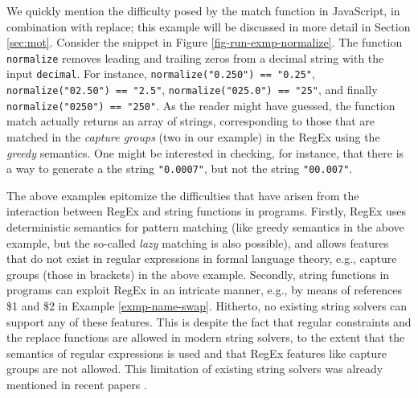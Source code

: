 \begin{example}\label{ex:normalize}
    We quickly mention the difficulty posed by the match function in JavaScript,
    in combination with replace; this example will be discussed in more
    detail in Section \ref{sec:mot}. Consider the snippet in Figure 
    \ref{fig-run-exmp-normalize}.
 The function {\tt normalize}   removes leading and trailing zeros from a decimal string with the input %
{\tt decimal}. For instance, 
 \texttt{normalize("0.250") == "0.25"},
 \texttt{normalize("02.50") == "2.5"},
 \texttt{normalize("025.0") == "25"},
and finally  \texttt{normalize("0250") == "250"}. As the reader might have
    guessed, the function match actually returns an array of strings,
    corresponding to those that are matched in the \emph{capture groups} (two 
    in our example) in the RegEx using the \emph{greedy} semantics. One might be
    interested in checking, for instance, that there is a way to generate a
    the string \texttt{"0.0007"}, but not the string \texttt{"00.007"}.
\end{example}



The above examples epitomize the difficulties that have arisen from the
interaction between RegEx and string functions in programs. Firstly,
RegEx uses deterministic semantics for pattern matching (like greedy
semantics in the above example, but the so-called \emph{lazy} matching is
also possible), and allows features that do not exist in regular expressions in
formal language theory, e.g., capture groups (those in brackets) in the above
example. Secondly, string functions in programs can exploit RegEx in an
intricate manner, e.g., by means of references \$1 and \$2 in Example 
\ref{exmp-name-swap}. Hitherto, no existing string solvers
can support any of these features. This is despite the fact that regular 
constraints and the replace functions are allowed in modern string solvers, 
to the extent that the semantics of regular expressions is used and that 
RegEx features like capture groups are not allowed. This limitation of existing
string solvers was already mentioned in recent papers \cite{aratha,LMK19}.

